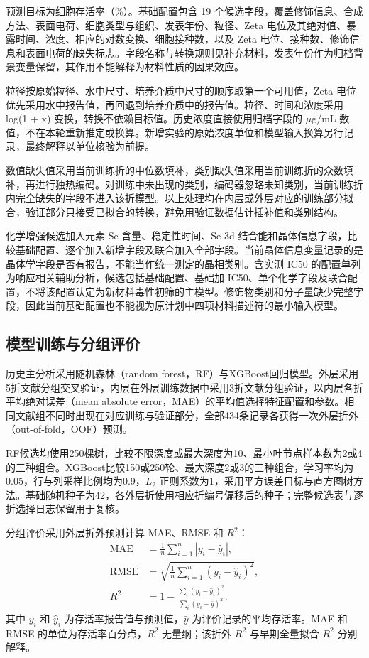 \documentclass[letterpaper]{article}
\begin{document}
预测目标为细胞存活率（\%）。基础配置包含 19 个候选字段，覆盖修饰信息、合成方法、表面电荷、细胞类型与组织、发表年份、粒径、Zeta 电位及其绝对值、暴露时间、浓度、相应的对数变换、细胞接种数，以及 Zeta 电位、接种数、修饰信息和表面电荷的缺失标志。字段名称与转换规则见补充材料，发表年份作为归档背景变量保留，其作用不能解释为材料性质的因果效应。

粒径按原始粒径、水中尺寸、培养介质中尺寸的顺序取第一个可用值，Zeta 电位优先采用水中报告值，再回退到培养介质中的报告值。粒径、时间和浓度采用 log(1 + x) 变换，转换不依赖目标值。历史浓度直接使用归档字段的 \ensuremath{\mu}g/mL 数值，不在本轮重新推定或换算。新增实验的原始浓度单位和模型输入换算另行记录，最终解释以单位核验为前提。

数值缺失值采用当前训练折的中位数填补，类别缺失值采用当前训练折的众数填补，再进行独热编码。对训练中未出现的类别，编码器忽略未知类别，当前训练折内完全缺失的字段不进入该折模型。以上处理均在内层或外层对应的训练部分拟合，验证部分只接受已拟合的转换，避免用验证数据估计插补值和类别结构。

化学增强候选加入元素 Se 含量、稳定性时间、Se 3d 结合能和晶体信息字段，比较基础配置、逐个加入新增字段及联合加入全部字段。当前晶体信息变量记录的是晶体学字段是否有报告，不能当作统一测定的晶相类别。含实测 IC50 的配置单列为响应相关辅助分析，候选包括基础配置、基础加 IC50、单个化学字段及联合配置，不将该配置认定为新材料毒性初筛的主模型。修饰物类别和分子量缺少完整字段，因此当前基础配置也不能视为原计划中四项材料描述符的最小输入模型。

\subsection{模型训练与分组评价}

历史主分析采用随机森林（random forest，RF）\cite{breiman2001random}与XGBoost\cite{chen2016xgboost}回归模型。外层采用5折文献分组交叉验证，内层在外层训练数据中采用3折文献分组验证，以内层各折平均绝对误差（mean absolute error，MAE）的平均值选择特征配置和参数。相同文献组不同时出现在对应训练与验证部分，全部434条记录各获得一次外层折外（out-of-fold，OOF）预测。

RF候选均使用250棵树，比较不限深度或最大深度为10、最小叶节点样本数为2或4的三种组合。XGBoost比较150或250轮、最大深度2或3的三种组合，学习率均为0.05，行与列采样比例均为0.9，$L_2$ 正则系数为1，采用平方误差目标与直方图树方法。基础随机种子为42，各外层折使用相应折编号偏移后的种子；完整候选表与逐折选择日志保留用于复核。

分组评价采用外层折外预测计算 MAE、RMSE 和 $R^2$：
\begin{align}
\mathrm{MAE}&=\frac{1}{n}\sum_{i=1}^{n}|y_i-\hat y_i|,\\
\mathrm{RMSE}&=\sqrt{\frac{1}{n}\sum_{i=1}^{n}(y_i-\hat y_i)^2},\\
R^2&=1-\frac{\sum_i(y_i-\hat y_i)^2}{\sum_i(y_i-\bar y)^2}.
\end{align}
其中 $y_i$ 和 $\hat y_i$ 为存活率报告值与预测值，$\bar y$ 为评价记录的平均存活率。MAE 和 RMSE 的单位为存活率百分点，$R^2$ 无量纲；该折外 $R^2$ 与早期全量拟合 $R^2$ 分别解释。
\end{document}
